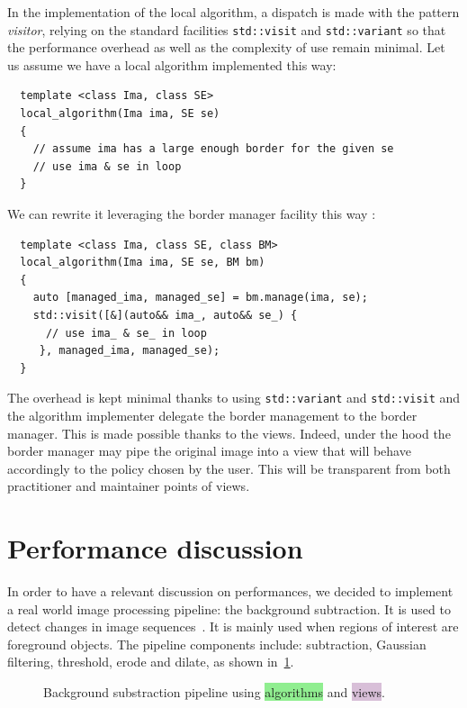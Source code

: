 In the implementation of the local algorithm, a dispatch is made with the pattern \emph{visitor}, relying on the
standard facilities \texttt{std::visit} and \texttt{std::variant} so that the performance overhead as well as the
complexity of use remain minimal. Let us assume we have a local algorithm implemented this way:
\begin{verbatim}
  template <class Ima, class SE>
  local_algorithm(Ima ima, SE se)
  {
    // assume ima has a large enough border for the given se
    // use ima & se in loop
  }
\end{verbatim}
We can rewrite it leveraging the border manager facility this way :
\begin{verbatim}
  template <class Ima, class SE, class BM>
  local_algorithm(Ima ima, SE se, BM bm)
  {
    auto [managed_ima, managed_se] = bm.manage(ima, se);
    std::visit([&](auto&& ima_, auto&& se_) { 
      // use ima_ & se_ in loop
     }, managed_ima, managed_se);
  }
\end{verbatim}
The overhead is kept minimal thanks to using \texttt{std::variant} and \texttt{std::visit} and the algorithm implementer
delegate the border management to the border manager. This is made possible thanks to the views. Indeed, under the hood
the border manager may pipe the original image into a view that will behave accordingly to the policy chosen by the user.
This will be transparent from both practitioner and maintainer points of views.


\section{Performance discussion}

In order to have a relevant discussion on performances, we decided to implement a real world image processing pipeline:
the background subtraction. It is used to detect changes in image sequences~\cite{opencv.bg_sub}. It is mainly used when
regions of interest are foreground objects. The pipeline components include: subtraction, Gaussian filtering, threshold,
erode and dilate, as shown in~\ref{fig.view.comp.sub_bg}.

\begin{figure}[tbh]
  \begin{minipage}{\linewidth}
    
  \end{minipage}
  \caption{Background substraction pipeline using \colorbox{lightgreen}{algorithms} and
    \colorbox{thistle}{views}.}
  \label{fig.view.comp.sub_bg}
\end{figure}


